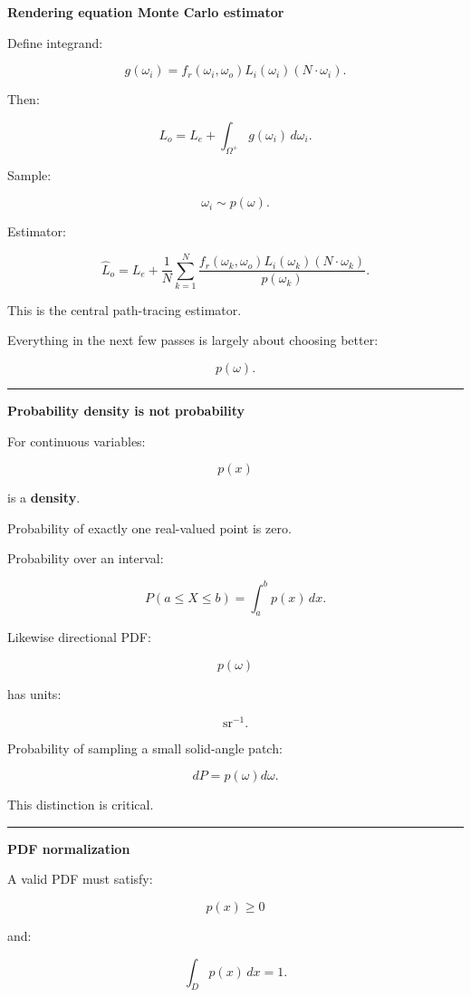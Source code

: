 \textbf{Rendering equation Monte Carlo estimator}

Define integrand:

\[
g(\omega_i)
=
f_r(\omega_i,\omega_o)
L_i(\omega_i)
(N\cdot\omega_i).
\]

Then:

\[
L_o
=
L_e+
\int_{\Omega^+}
g(\omega_i)
\,d\omega_i.
\]

Sample:

\[
\omega_i\sim p(\omega).
\]

Estimator:

\[
\boxed{
\hat L_o
=
L_e
+
\frac1N
\sum_{k=1}^{N}
\frac{
f_r(\omega_k,\omega_o)
L_i(\omega_k)
(N\cdot\omega_k)
}{
p(\omega_k)
}.
}
\]

This is the central path-tracing estimator.

Everything in the next few passes is largely about choosing better:

\[
p(\omega).
\]

\begin{center}\rule{0.5\linewidth}{0.5pt}\end{center}

\textbf{Probability density is not probability}

For continuous variables:

\[
p(x)
\]

is a \textbf{density}.

Probability of exactly one real-valued point is zero.

Probability over an interval:

\[
P(a\le X\le b)
=
\int_a^b
p(x)\,dx.
\]

Likewise directional PDF:

\[
p(\omega)
\]

has units:

\[
\mathrm{sr}^{-1}.
\]

Probability of sampling a small solid-angle patch:

\[
dP
=
p(\omega)d\omega.
\]

This distinction is critical.

\begin{center}\rule{0.5\linewidth}{0.5pt}\end{center}

\textbf{PDF normalization}

A valid PDF must satisfy:

\[
p(x)\ge0
\]

and:

\[
\boxed{
\int_Dp(x)\,dx=1.
}
\]

